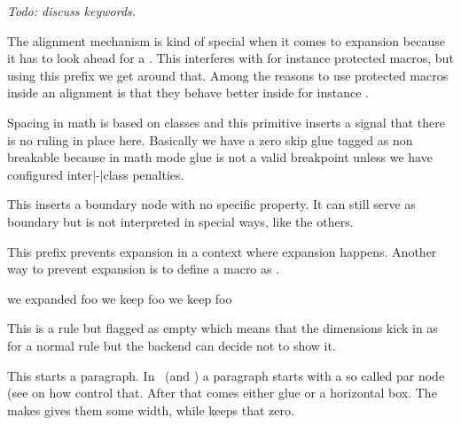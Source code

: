 {\em Todo: discuss keywords.}

\stopoldprimitive

\startnewprimitive[title={\prm {noaligned}}]

The alignment mechanism is kind of special when it comes to expansion because it
has to look ahead for a . This interferes with for instance
protected macros, but using this prefix we get around that. Among the reasons to
use protected macros inside an alignment is that they behave better inside for
instance .

\stopnewprimitive

\startnewprimitive[title={\prm {noatomruling}}]

Spacing in math is based on classes and this primitive inserts a signal that
there is no ruling in place here. Basically we have a zero skip glue tagged as
non breakable because in math mode glue is not a valid breakpoint unless we have
configured inter|-|class penalties.

\stopnewprimitive

\startnewprimitive[title={\prm {noboundary}}]

This inserts a boundary node with no specific property. It can still serve as
boundary but is not interpreted in special ways, like the others.

\stopnewprimitive

\startoldprimitive[title={\prm {noexpand}}]

This prefix prevents expansion in a context where expansion happens. Another way
to prevent expansion is to define a macro as .

\startbuffer
          \def\foo{foo} \edef\oof{we expanded      \foo} \meaning\oof
          \def\foo{foo} \edef\oof{we keep \noexpand\foo} \meaning\oof
\protected\def\foo{foo} \edef\oof{we keep          \foo} \meaning\oof
\stopbuffer

\typebuffer

\startlines
\getbuffer
\stoplines

\stopoldprimitive

\startnewprimitive[title={\prm {nohrule}}]

This is a rule but flagged as empty which means that the dimensions kick in as
for a normal rule but the backend can decide not to show it.

\stopnewprimitive

\startoldprimitive[title={\prm {noindent}}]

This starts a paragraph. In \LUATEX\ (and \LUAMETATEX) a paragraph starts with a
so called par node (see  on how control that. After that comes
either  glue or a horizontal box. The  makes gives
them some width, while  keeps that zero.

